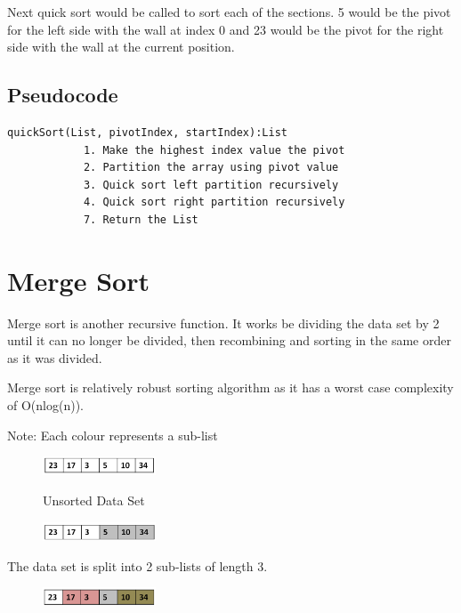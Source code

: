 Next quick sort would be called to sort each of the sections. 5 would be the pivot for the left side with the wall at index 0 and 23 would be the pivot for the right side with the wall at the current position.

\subsection{Pseudocode}

\begin{verbatim}
quickSort(List, pivotIndex, startIndex):List
            1. Make the highest index value the pivot
            2. Partition the array using pivot value
            3. Quick sort left partition recursively
            4. Quick sort right partition recursively
            7. Return the List
\end{verbatim}

\section{Merge Sort}

Merge sort is another recursive function. It works be dividing the data set by 2 until it can no longer be divided, then recombining and sorting in the same order as it was divided. 

Merge sort is relatively robust sorting algorithm as it has a worst case complexity of O(nlog(n)). 

Note: Each colour represents a sub-list

\begin{figure}[H]
\centering
\includegraphics[width=0.3\textwidth]{pictures/merge1.png}
\label{fig:merge1}
\caption{Unsorted Data Set}
\end{figure}

\begin{figure}[H]
\centering
\includegraphics[width=0.3\textwidth]{pictures/merge2.png}
\label{fig:merge2}
\end{figure}

The data set is split into 2 sub-lists of length 3.

\begin{figure}[H]
\centering
\includegraphics[width=0.3\textwidth]{pictures/merge3.png}
\label{fig:merge3}
\end{figure}

